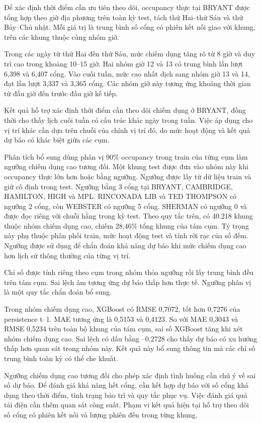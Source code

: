 \documentclass[conference,a4paper]{IEEEtran}
\begin{document}
Để xác định thời điểm cần ưu tiên theo dõi, occupancy thực tại BRYANT được tổng hợp theo giờ địa phương trên toàn kỳ test, tách thứ Hai–thứ Sáu và thứ Bảy–Chủ nhật. Mỗi giá trị là trung bình số cổng có phiên kết nối giao với khung, trên các khung thuộc cùng nhóm giờ.

Trong các ngày từ thứ Hai đến thứ Sáu, mức chiếm dụng tăng rõ từ 8 giờ và duy trì cao trong khoảng 10–15 giờ. Hai nhóm giờ 12 và 13 có trung bình lần lượt 6,398 và 6,407 cổng. Vào cuối tuần, mức cao nhất dịch sang nhóm giờ 13 và 14, đạt lần lượt 3,337 và 3,365 cổng. Các nhóm giờ này tương ứng khoảng thời gian từ đầu giờ đến trước đầu giờ kế tiếp.

Kết quả hỗ trợ xác định thời điểm cần theo dõi chiếm dụng ở BRYANT, đồng thời cho thấy lịch cuối tuần có cấu trúc khác ngày trong tuần. Việc áp dụng cho vị trí khác cần dựa trên chuỗi của chính vị trí đó, do mức hoạt động và kết quả dự báo có khác biệt giữa các cụm.

Phân tích bổ sung dùng phân vị 90\% occupancy trong train của từng cụm làm ngưỡng chiếm dụng cao tương đối. Một khung test được đưa vào nhóm này khi occupancy thực lớn hơn hoặc bằng ngưỡng. Ngưỡng được lấy từ dữ liệu train và giữ cố định trong test. Ngưỡng bằng 3 cổng tại BRYANT, CAMBRIDGE, HAMILTON, HIGH và MPL. RINCONADA LIB và TED THOMPSON có ngưỡng 2 cổng, còn WEBSTER có ngưỡng 5 cổng. SHERMAN có ngưỡng 0 và được đọc riêng với chuỗi hằng trong kỳ test. Theo quy tắc trên, có 40.218 khung thuộc nhóm chiếm dụng cao, chiếm 28,46\% tổng khung của tám cụm. Tỷ trọng này phụ thuộc phân phối train, mức hoạt động test và tính rời rạc của số đếm. Ngưỡng được sử dụng để chẩn đoán khả năng dự báo khi mức chiếm dụng cao hơn lịch sử thông thường của từng vị trí.

Chỉ số được tính riêng theo cụm trong nhóm thỏa ngưỡng rồi lấy trung bình đều trên tám cụm. Sai lệch âm tương ứng dự báo thấp hơn thực tế. Ngưỡng phân vị là một quy tắc chẩn đoán bổ sung.

Trong nhóm chiếm dụng cao, XGBoost có RMSE 0,7072, tốt hơn 0,7276 của persistence t–1. MAE tương ứng là 0,5153 và 0,4123. So với MAE 0,3043 và RMSE 0,5234 trên toàn bộ khung của tám cụm, sai số XGBoost tăng khi xét nhóm chiếm dụng cao. Sai lệch có dấu bằng –0,2728 cho thấy dự báo có xu hướng thấp hơn quan sát trong nhóm này. Kết quả này bổ sung thông tin mà các chỉ số trung bình toàn kỳ có thể che khuất.

Ngưỡng chiếm dụng cao tương đối cho phép xác định tình huống cần chú ý về sai số dự báo. Để đánh giá khả năng hết cổng, cần kết hợp dự báo với số cổng khả dụng theo thời điểm, tình trạng bảo trì và quy tắc phục vụ. Việc đánh giá quá tải điện cần thêm quan sát công suất. Phạm vi kết quả hiện tại hỗ trợ theo dõi số cổng có phiên kết nối và lượng phiên đến trong từng khung.
\end{document}
